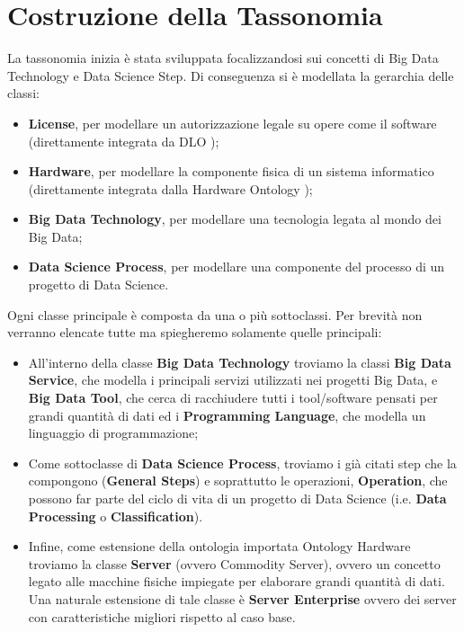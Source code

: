 \section{Costruzione della Tassonomia}
La tassonomia inizia è stata sviluppata focalizzandosi sui concetti di Big Data Technology e Data Science Step. Di conseguenza si è modellata la gerarchia delle classi:
\begin{itemize}
    \item \textbf{License}, per modellare un autorizzazione legale su opere come il software (direttamente integrata da DLO \cite{DLO});
    \item \textbf{Hardware}, per modellare la componente fisica di un sistema informatico (direttamente integrata dalla Hardware Ontology \cite{Hardware_Ontology});
     \item \textbf{Big Data Technology}, per modellare una tecnologia legata al mondo dei Big Data;
     \item \textbf{Data Science Process}, per modellare una componente del processo di un progetto di Data Science.
\end{itemize}
Ogni classe principale è composta da una o più sottoclassi. Per brevità non verranno elencate tutte ma spiegheremo solamente quelle principali:
\begin{itemize}
    \item All'interno della classe \textbf{Big Data Technology} troviamo la classi \textbf{Big Data Service}, che modella i principali servizi utilizzati nei progetti Big Data, e \textbf{Big Data Tool}, che cerca di racchiudere tutti i tool/software pensati per grandi quantità di dati ed i \textbf{Programming Language}, che modella un linguaggio di programmazione;
    \item Come sottoclasse di \textbf{Data Science Process}, troviamo i già citati step che la compongono (\textbf{General Steps}) e soprattutto le operazioni, \textbf{Operation}, che possono far parte del ciclo di vita di un progetto di Data Science (i.e. \textbf{Data Processing} o \textbf{Classification}).
    \item Infine, come estensione della ontologia importata Ontology Hardware \cite{Hardware_Ontology} troviamo la classe \textbf{Server} (ovvero Commodity Server), ovvero un concetto legato alle macchine fisiche impiegate per elaborare grandi quantità di dati. Una naturale estensione di tale classe è \textbf{Server Enterprise} ovvero dei server con caratteristiche migliori rispetto al caso base.
\end{itemize}


